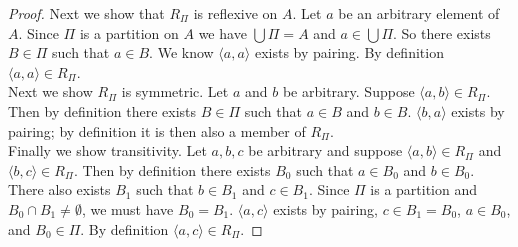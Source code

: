 \documentclass{report}
\begin{document}
\begin{proof}
\indent Next we show that $R_\Pi$ is reflexive on $A$. Let $a$ be an arbitrary element of $A$. Since $\Pi$ is a partition on $A$
we have $\bigcup\Pi=A$ and $a\in\bigcup\Pi$. So there exists $B\in\Pi$ such that $a\in B$. We know $\langle a,a\rangle$ exists by pairing. By definition $\langle a,a\rangle\in R_\Pi$.\\
\indent Next we show $R_\Pi$ is symmetric. Let $a$ and $b$ be arbitrary. Suppose $\langle a,b\rangle\in R_\Pi$. Then by definition there exists $B\in\Pi$ such that $a\in B$ and $b\in B$.
$\langle b,a\rangle$ exists by pairing; by definition it is then also a member of $R_\Pi$.\\
\indent Finally we show transitivity. Let $a,b,c$ be arbitrary and suppose $\langle a,b\rangle\in R_\Pi$ and $\langle b,c\rangle\in R_\Pi$. Then by definition there exists $B_0$ such that $a\in B_0$
and $b\in B_0$. There also exists $B_1$ such that $b\in B_1$ and $c\in B_1$. Since $\Pi$ is a partition and $B_0\cap B_1\neq\emptyset$, we must have $B_0=B_1$. $\langle a,c\rangle$ exists by
pairing, $c\in B_1=B_0$, $a\in B_0$, and $B_0\in\Pi$. By definition $\langle a,c\rangle\in R_\Pi$.
\end{proof}
\newpage
\end{document}
